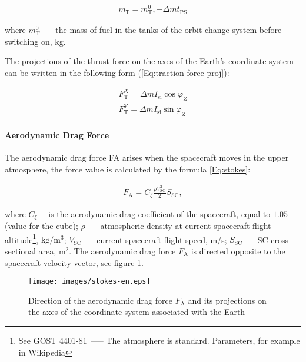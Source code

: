 \documentclass[12pt,a4paper]{article}
\begin{document}
\begin{eqnarray}
  m_{\text{Т}} = m_{\text{T}}^0, - \Delta m t_{\text{PS}}
\end{eqnarray}

where $m_{\text{T}}^0$~--– the mass of fuel in the tanks of the orbit change system before switching on,
kg.

The projections of the thrust force on the axes of the Earth's coordinate system can be written in the following form
(\ref{Eq:traction-force-proj}):

\begin{eqnarray}
  F_{\text{T}}^X = \Delta m I_{\text{si}} \cos{\varphi_Z} \nonumber \\
  F_{\text{T}}^Y = \Delta m I_{\text{si}} \sin{\varphi_Z} \label{Eq:traction-force-proj}
\end{eqnarray}

\paragraph{Aerodynamic Drag Force}

The aerodynamic drag force FA arises when the spacecraft moves in the upper atmosphere, the force value is calculated by the formula \ref{Eq:stokes}:

\begin{eqnarray}
   F_{\text{A}} = C_\xi \frac{\rho V_{\text{SC}}^2}{2} S_{\text{SC}}, \label{Eq:stokes}
\end{eqnarray}

where $C_\xi$~-- is the aerodynamic drag coefficient of the spacecraft, equal to $1.05$ (value for the cube); $\rho$~--– atmospheric density at current spacecraft flight altitude\footnote{See GOST 4401-81~--— The atmosphere is standard. Parameters, for example in Wikipedia}, $\text{kg}/\text{m}^3$; $V_{\text{SC}}$~--– current spacecraft flight speed, m/s; $S_{\text{SC}}$~--- SC cross-sectional area, $\text{m}^2$. The aerodynamic drag force $F_{\text{A}}$ is directed opposite to the spacecraft velocity vector, see figure \ref{Pic:Stokes}.

\begin{figure}[tbh]
  \begin{center}
    \texttt{[image: images/stokes-en.eps]}
    \caption{Direction of the aerodynamic drag force $F_{\text{A}}$ and its projections on the axes of the coordinate system associated with the Earth}
    \label{Pic:Stokes}
  \end{center}
\end{figure}
\end{document}

